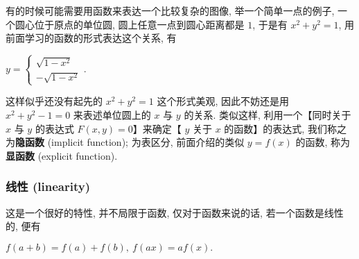 有的时候可能需要用函数来表达一个比较复杂的图像, 举一个简单一点的例子,
一个圆心位于原点的单位圆, 圆上任意一点到圆心距离都是 \(1\), 于是有
\(x^2+y^2=1\), 用前面学习的函数的形式表达这个关系, 有

\(y=\begin{cases}\sqrt{1-x^2}\\-\sqrt{1-x^2}\end{cases}.\)

这样似乎还没有起先的 \(x^2+y^2=1\) 这个形式美观, 因此不妨还是用
\(x^2+y^2-1=0\) 来表述单位圆上的 \(x\) 与 \(y\) 的关系. 类似这样,
利用一个【同时关于 \(x\) 与 \(y\) 的表达式 \(F(x,y)=0\)】来确定【 \(y\)
关于 \(x\) 的函数】的表达式, 我们称之为\textbf{隐函数} (implicit
function); 为表区分, 前面介绍的类似 \(y=f(x)\) 的函数,
称为\textbf{显函数} (explicit function).

\hypertarget{ux7ebfux6027-linearity}{%
\subsubsection{线性 (linearity)}\label{ux7ebfux6027-linearity}}

这是一个很好的特性, 并不局限于函数, 仅对于函数来说的话,
若一个函数是线性的, 便有

\(f(a+b)=f(a)+f(b),\ f(ax)=af(x).\)
